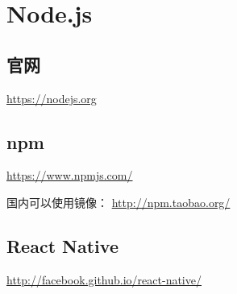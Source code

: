 
\chapter{Node.js}
\section{官网}
\url{https://nodejs.org}

\section{npm}
\url{https://www.npmjs.com/}

国内可以使用镜像：
\url{http://npm.taobao.org/}

\section{React Native}
\url{http://facebook.github.io/react-native/}